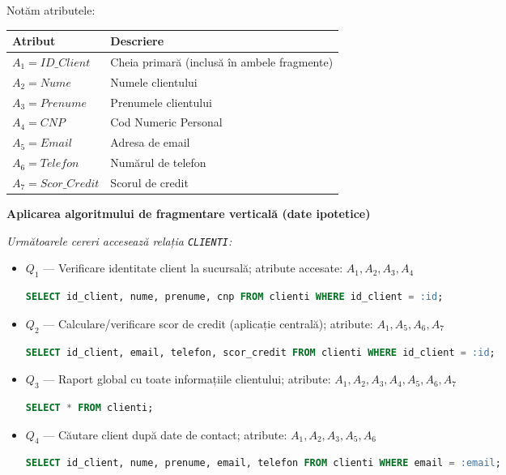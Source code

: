 \documentclass[12pt,a4paper]{article}
\begin{document}
Notăm atributele:

\begin{center}
\begin{tabular}{l|l}
\toprule
Atribut & Descriere \\
\midrule
$A_1 = ID\_Client$ & Cheia primară (inclusă în ambele fragmente) \\
$A_2 = Nume$       & Numele clientului \\
$A_3 = Prenume$    & Prenumele clientului \\
$A_4 = CNP$        & Cod Numeric Personal \\
$A_5 = Email$      & Adresa de email \\
$A_6 = Telefon$    & Numărul de telefon \\
$A_7 = Scor\_Credit$ & Scorul de credit \\
\bottomrule
\end{tabular}
\end{center}

\textbf{Aplicarea algoritmului de fragmentare verticală (date ipotetice)}

\textit{Următoarele cereri accesează relația \texttt{CLIENTI}:}

\begin{itemize}
  \item $Q_1$ — Verificare identitate client la sucursală; atribute accesate: $A_1, A_2, A_3, A_4$
\begin{lstlisting}[language=SQL]
SELECT id_client, nume, prenume, cnp FROM clienti WHERE id_client = :id;
\end{lstlisting}
  \item $Q_2$ — Calculare/verificare scor de credit (aplicație centrală); atribute: $A_1, A_5, A_6, A_7$
\begin{lstlisting}[language=SQL]
SELECT id_client, email, telefon, scor_credit FROM clienti WHERE id_client = :id;
\end{lstlisting}
  \item $Q_3$ — Raport global cu toate informațiile clientului; atribute: $A_1, A_2, A_3, A_4, A_5, A_6, A_7$
\begin{lstlisting}[language=SQL]
SELECT * FROM clienti;
\end{lstlisting}
  \item $Q_4$ — Căutare client după date de contact; atribute: $A_1, A_2, A_3, A_5, A_6$
\begin{lstlisting}[language=SQL]
SELECT id_client, nume, prenume, email, telefon FROM clienti WHERE email = :email;
\end{lstlisting}
\end{itemize}
\end{document}
